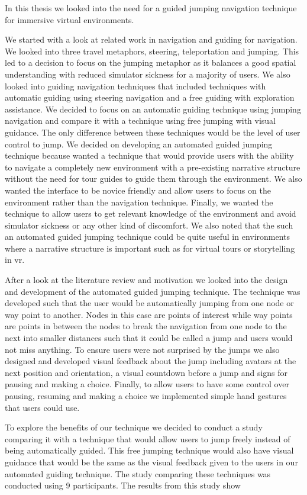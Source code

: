 \label{Chapter:Conclusion and Future Work}
In this thesis we looked into the need for a guided jumping navigation technique for immersive virtual environments.

We started with a look at related work in navigation and guiding for navigation. We looked into three travel metaphors, steering, teleportation and jumping. This led to a decision to focus on the jumping metaphor as it balances a good spatial understanding with reduced simulator sickness for a majority of users. We also looked into guiding navigation techniques that included techniques with automatic guiding using steering navigation and a free guiding with exploration assistance. We decided to focus on an automatic guiding technique using jumping navigation and compare it with a technique using free jumping with visual guidance. The only difference between these techniques would be the level of user control to jump. We decided on developing an automated guided jumping technique because wanted a technique that would provide users with the ability to navigate a completely new environment with a pre-existing narrative structure without the need for tour guides to guide them through the environment. We also wanted the interface to be novice friendly and allow users to focus on the environment rather than the navigation technique. Finally, we wanted the technique to allow users to get relevant knowledge of the environment and avoid simulator sickness or any other kind of discomfort. We also noted that the such an automated guided jumping technique could be quite useful in environments where a narrative structure is important such as for virtual tours or storytelling in \acrshort{vr}.

After a look at the literature review and motivation we looked into the design and development of the automated guided jumping technique. The technique was developed such that the user would be automatically jumping from one node or way point to another. Nodes in this case are points of interest while way points are points in between the nodes to break the navigation from one node to the next into smaller distances such that it could be called a jump and users would not miss anything. To ensure users were not surprised by the jumps we also designed and developed visual feedback about the jump including avatars at the next position and orientation, a visual countdown before a jump and signs for pausing and making a choice. Finally, to allow users to have some control over pausing, resuming and making a choice we implemented simple hand gestures that users could use.

To explore the benefits of our technique we decided to conduct a study comparing it with a technique that would allow users to jump freely instead of being automatically guided. This free jumping technique would also have visual guidance that would be the same as the visual feedback given to the users in our automated guiding technique. The study comparing these techniques was conducted using 9 participants. The results from this study show